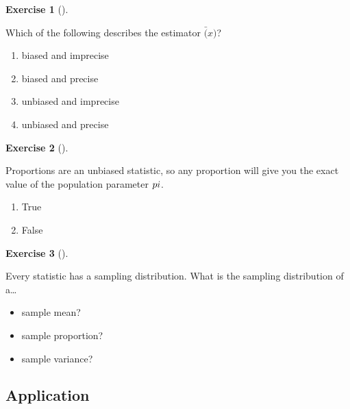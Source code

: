 \documentclass[
  letterpaper,
  DIV=11,
  numbers=noendperiod]{scrreprt}
\providecommand{\tightlist}{%
  \setlength{\itemsep}{0pt}\setlength{\parskip}{0pt}}\usepackage{longtable,booktabs,array}
\theoremstyle{definition}
\newtheorem{exercise}{Exercise}[chapter]
\theoremstyle{remark}
\begin{document}
\begin{exercise}[]\protect\hypertarget{exr-ch09-c10}{}\label{exr-ch09-c10}

Which of the following describes the estimator \(\bar(x)\)?

\begin{enumerate}
\def\labelenumi{\alph{enumi})}
\tightlist
\item
  biased and imprecise
\item
  biased and precise
\item
  unbiased and imprecise
\item
  unbiased and precise
\end{enumerate}

\end{exercise}

\begin{exercise}[]\protect\hypertarget{exr-ch09-c11}{}\label{exr-ch09-c11}

Proportions are an unbiased statistic, so any proportion will give you
the exact value of the population parameter \(\\pi\).

\begin{enumerate}
\def\labelenumi{\alph{enumi})}
\tightlist
\item
  True
\item
  False
\end{enumerate}

\end{exercise}

\begin{exercise}[]\protect\hypertarget{exr-ch09-c12}{}\label{exr-ch09-c12}

Every statistic has a sampling distribution. What is the sampling
distribution of a\ldots{}

\begin{itemize}
\tightlist
\item
  sample mean?
\item
  sample proportion?
\item
  sample variance?
\end{itemize}

\end{exercise}

\hypertarget{sec-ex09-application}{%
\subsection{Application}\label{sec-ex09-application}}
\end{document}
